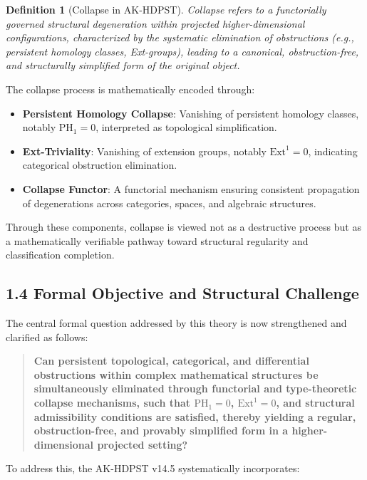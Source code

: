 \documentclass[11pt]{article}
\newtheorem{definition}[theorem]{Definition}
\begin{document}
\begin{definition}[Collapse in AK-HDPST]
Collapse refers to a functorially governed structural degeneration within projected higher-dimensional configurations,  
characterized by the systematic elimination of obstructions (e.g., persistent homology classes, Ext-groups),  
leading to a canonical, obstruction-free, and structurally simplified form of the original object.
\end{definition}

The collapse process is mathematically encoded through:

\begin{itemize}
    \item \textbf{Persistent Homology Collapse}: Vanishing of persistent homology classes, notably $\mathrm{PH}_1 = 0$, interpreted as topological simplification.
    \item \textbf{Ext-Triviality}: Vanishing of extension groups, notably $\mathrm{Ext}^1 = 0$, indicating categorical obstruction elimination.
    \item \textbf{Collapse Functor}: A functorial mechanism ensuring consistent propagation of degenerations across categories, spaces, and algebraic structures.
\end{itemize}

Through these components, collapse is viewed not as a destructive process but as a mathematically verifiable pathway toward structural regularity and classification completion.

\subsection*{1.4 Formal Objective and Structural Challenge}

The central formal question addressed by this theory is now strengthened and clarified as follows:

\begin{quote}
\textbf{Can persistent topological, categorical, and differential obstructions within complex mathematical structures  
be simultaneously eliminated through functorial and type-theoretic collapse mechanisms,  
such that $\mathrm{PH}_1 = 0$, $\mathrm{Ext}^1 = 0$, and structural admissibility conditions are satisfied,  
thereby yielding a regular, obstruction-free, and provably simplified form in a higher-dimensional projected setting?}
\end{quote}

To address this, the AK-HDPST v14.5 systematically incorporates:
\end{document}
